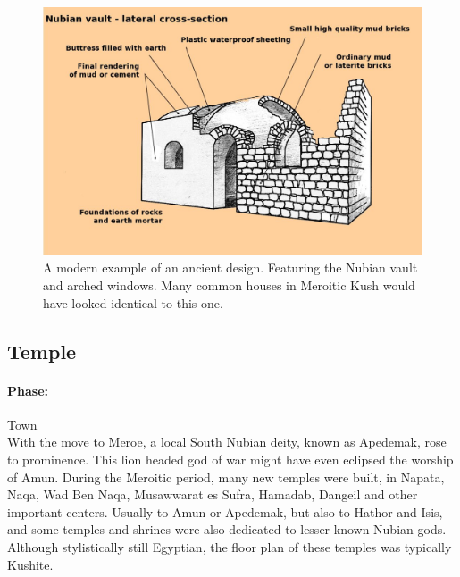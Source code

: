 \documentclass[a4paper,12pt]{scrreprt}
\begin{document}
\begin{figure}[H]
	\centering
	\includegraphics[width=\textwidth]{img/house/nubian_vault_sketch}
	\caption{A modern example of an ancient design. Featuring the Nubian vault and arched windows. Many common houses in Meroitic Kush would have looked identical to this one.}
\end{figure}

\subsection{Temple}

\paragraph{Phase:} Town\\

With the move to Meroe, a local South Nubian deity, known as Apedemak, rose to prominence. This lion headed god of war might have even eclipsed the worship of Amun. During the Meroitic period, many new temples were built, in Napata, Naqa, Wad Ben Naqa, Musawwarat es Sufra, Hamadab, Dangeil and other important centers. Usually to Amun or Apedemak, but also to Hathor and Isis, and some temples and shrines were also dedicated to lesser-known Nubian gods. Although stylistically still Egyptian, the floor plan of these temples was typically Kushite. 
\end{document}
